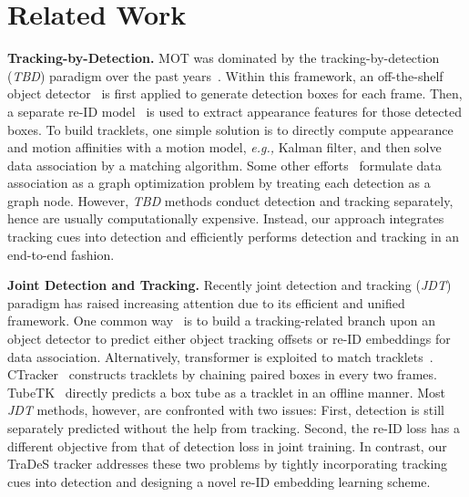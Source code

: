 \documentclass[final]{cvpr}
\newcommand{\myparagraph}[1]{{\vspace{0.5em} \noindent \bf #1}}
\begin{document}
\section{Related Work}
\myparagraph{Tracking-by-Detection.} MOT was dominated by the tracking-by-detection (\emph{TBD}) paradigm over the past years~\cite{yin2020unified,braso2020learning,zhu2018online,xu2019spatial,schulter2017deep,bewley2016simple,tang2017multiple,Weng_2020_CVPR,xu2020segment}. Within this framework, an off-the-shelf object detector~\cite{ren2015faster,felzenszwalb2009object} is first applied to generate detection boxes for each frame. Then, a separate re-ID model~\cite{tracktor,wojke2017simple} is used to extract appearance features for those detected boxes. To build tracklets, one simple solution is to directly compute appearance and motion affinities with a motion model, \emph{e.g.,} Kalman filter, and then solve data association by a matching algorithm. Some other efforts~\cite{braso2020learning,wen2014multiple,kim2015multiple} formulate data association as a graph optimization problem by treating each detection as a graph node. However, \emph{TBD} methods conduct detection and tracking separately, hence are usually computationally expensive. Instead, our approach integrates tracking cues into detection and efficiently performs detection and tracking in an end-to-end fashion.

\myparagraph{Joint Detection and Tracking.} Recently joint detection and tracking (\emph{JDT}) paradigm has raised increasing attention due to its efficient and unified framework. One common way~\cite{CenterTrack,wang2019towards,lu2020retinatrack,tracktor,zhang2018integrated,zhang2020fairmot} is to build a tracking-related branch upon an object detector to predict either object tracking offsets or re-ID embeddings for data association. Alternatively, transformer is exploited to match tracklets~\cite{sun2020transtrack,meinhardt2021trackformer}. CTracker~\cite{CTacker} constructs tracklets by chaining paired boxes in every two frames. TubeTK~\cite{tubetk} directly predicts a box tube as a tracklet in an offline manner. Most \emph{JDT} methods, however, are confronted with two issues: First, detection is still separately predicted without the help from tracking. Second, the re-ID loss has a different objective from that of detection loss in joint training. In contrast, our TraDeS tracker addresses these two problems by tightly incorporating tracking cues into detection and designing a novel re-ID embedding learning scheme.
\end{document}
